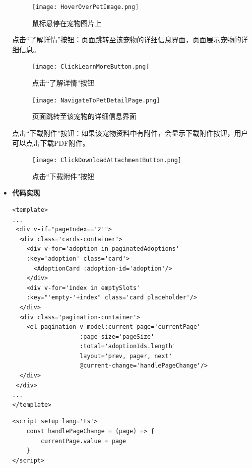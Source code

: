 \begin{itemize}
	\begin{figure}[H]
		\centering
		\texttt{[image: HoverOverPetImage.png]} 
		\caption{鼠标悬停在宠物图片上}
		\label{fig:Hover over pet image}
	\end{figure}
	
	点击“了解详情”按钮：页面跳转至该宠物的详细信息界面，页面展示宠物的详细信息。
	
	\begin{figure}[H]
		\centering
		\texttt{[image: ClickLearnMoreButton.png]} 
		\caption{点击“了解详情”按钮}
		\label{fig:Click learn more button}
	\end{figure}
	
	\begin{figure}[H]
		\centering
		\texttt{[image: NavigateToPetDetailPage.png]}
		\caption{页面跳转至该宠物的详细信息界面}
		\label{fig:Navigate to pet detail page}
	\end{figure}
	
	点击“下载附件”按钮：如果该宠物资料中有附件，会显示下载附件按钮，用户可以点击下载PDF附件。
	
	\begin{figure}[H]
		\centering
		\texttt{[image: ClickDownloadAttachmentButton.png]} 
		\caption{点击“下载附件”按钮}
		\label{fig:Click download attachment button}
	\end{figure}
	
	\item[] \textbf{代码实现}
	\begin{verbatim}
<template>
...
 <div v-if="pageIndex=='2'">
  <div class='cards-container'>
    <div v-for='adoption in paginatedAdoptions' 
    :key='adoption' class='card'>
      <AdoptionCard :adoption-id='adoption'/>
    </div>
    <div v-for='index in emptySlots' 
    :key="'empty-'+index" class='card placeholder'/>
  </div>
  <div class='pagination-container'>
    <el-pagination v-model:current-page='currentPage'
                   :page-size='pageSize'
                   :total='adoptionIds.length'
                   layout='prev, pager, next'
                   @current-change='handlePageChange'/>
  </div>
 </div>
...
</template>
	\end{verbatim}
	
	\begin{verbatim}
<script setup lang='ts'>
	const handlePageChange = (page) => {
		currentPage.value = page
	}
</script>
	\end{verbatim}
\end{itemize}

